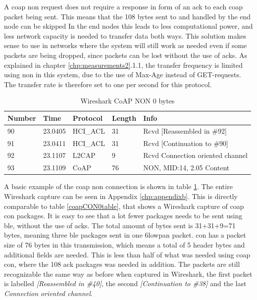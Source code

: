 \noindent A \gls{coap} \gls{non} request does not require a response in form of an \gls{ack} to each \gls{coap} packet being sent. This means that the 108 bytes sent to and handled by the end node can be skipped In the end nodes this leads to less computational power, and less network capacity is needed to transfer data both ways. This solution makes sense to use in networks where the system will still work as needed even if some packets are being dropped, since packets can be lost without the use of \glspl{ack}. As explained in chapter \ref{chp:measurements2}.1.1, the transfer frequency is limited using \gls{non} in this system, due to the use of Max-Age instead of GET-requests. The transfer rate is therefore set to one per second for this protocol. 

\begin{table}[ht]
\small
\centering
\caption{Wireshark CoAP NON 0 bytes}
\label{coapNON0table}
\begin{tabular}{lllll}
\hline
Number & Time    & Protocol & Length & Info                             \\ \hline
90     & 23.0405 & HCI\_ACL & 31     & Rcvd {[}Reassembled in \#92{]}   \\
91     & 23.0411 & HCI\_ACL & 31     & Rcvd {[}Continuation to \#90{]}  \\
92     & 23.1107 & L2CAP    & 9      & Rcvd Connection oriented channel \\
93     & 23.1109 & CoAP     & 76     & NON, MID:14, 2.05 Content        \\ \hline
\end{tabular}
\end{table}


\noindent A basic example of the \gls{coap} \gls{non} connection is shown in table \ref{coapNON0table}. The entire Wireshark capture can be seen in Appendix \ref{chp:appendixb}. This is directly comparable to table \ref{coapCON0table}, that shows a Wireshark capture of \gls{coap} \gls{con} packages. It is easy to see that a lot fewer packages needs to be sent using \gls{ble}, without the use of \glspl{ack}. The total amount of bytes sent is 31+31+9=71 bytes, meaning three \gls{ble} packages sent in one \gls{6lowpan} packet. \gls{con} has a packet size of 76 bytes in this transmission, which means a total of 5 header bytes and additional fields are needed. This is less than half of what was needed using \gls{coap} \gls{con}, where the 108 \gls{ack} packages was needed in addition. The packets are still recognizable the same way as before when captured in Wireshark, the first packet is labelled \textit{[Reassembled in \#40]}, the second \textit{[Continuation to \#38]} and the last \textit{Connection oriented channel}.

